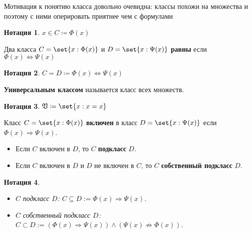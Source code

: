 \documentclass{article}
\newtheorem*{defnotation}{Нотация}
\newcommand{\class}[1]{\set{#1}}
\newcommand{\UniversalClass}{\mathfrak{V}}
\begin{document}
Мотивация к понятию класса довольно очевидна: классы похожи на множества и поэтому с ними оперировать приятнее чем с формулами
\begin{defnotation}
    \(x \in C \coloneq \Phi(x)\)
\end{defnotation}

\begin{definition}
    \label{def:class-equality}
    Два класса \(C = \class{x : \Phi(x)}\) и \(D = \class{x : \Psi(x)}\) \textbf{равны} если \(\Phi(x) \Leftrightarrow \Psi(x)\)
\end{definition}
\begin{defnotation}
    \(C = D \coloneq \Phi(x) \Leftrightarrow \Psi(x)\)
\end{defnotation}

\begin{definition}
    \label{def:universal-class}
    \textbf{Универсальным классом} называется класс всех множеств.
\end{definition}
\begin{defnotation}
    \(\UniversalClass \coloneq \class{x: x = x}\)
\end{defnotation}

\begin{definition}
    \label{def:subclasses}
    Класс \(C = \class{x : \Phi(x)}\) \textbf{включен} в класс \(D = \class{x : \Psi(x)}\) если \(\Phi(x) \Rightarrow \Psi(x)\). 
    \begin{itemize}
        \item Если \(C\) включен в \(D\), то \(C\) \textbf{подкласс} \(D\).
        \item Если \(C\) включен в \(D\) и \(D\) не включен в \(C\), то  \(C\) \textbf{собственный подкласс} \(D\).
    \end{itemize}
\end{definition}
\begin{defnotation} \  
    \begin{itemize}
        \item \(C\) подкласс \(D\): \(C \subseteq D := \Phi(x) \Rightarrow \Psi(x)\).
        \item \(C\) собственный подкласс \(D\): \(C \subset D := \left(\Phi(x) \Rightarrow \Psi(x)\right) \land \left(\Psi(x) \not\Rightarrow \Phi(x)\right)\).
    \end{itemize}
\end{defnotation}
\end{document}
